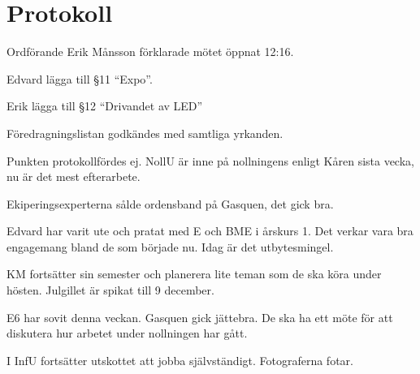 \documentclass[10pt]{article}
\def\mo{Erik Månsson}
\begin{document}
\section*{Protokoll}
\begin{paragrafer}
Ordförande {\mo} förklarade mötet öppnat 12:16.

{\valavmo}

{\valavms}

{\valavj}

{\tosg}

{\ingaadj}


Edvard \ypa lägga till \S11 ``Expo''.

Erik \ypa lägga till \S12 ``Drivandet av LED''

Föredragningslistan godkändes med samtliga yrkanden.
\begin{fyllnadsval} %
\end{fyllnadsval}

\begin{paragrafer}
Punkten protokollfördes ej.
NollU är inne på nollningens enligt Kåren sista vecka, nu är det mest efterarbete.

Ekiperingsexperterna sålde ordensband på Gasquen, det gick bra.

Edvard har varit ute och pratat med E och BME i årskurs 1. Det verkar vara bra engagemang bland de som började nu. Idag är det utbytesmingel.

KM fortsätter sin semester och planerera lite teman som de ska köra under hösten. Julgillet är spikat till 9 december.

E6 har sovit denna veckan. Gasquen gick jättebra. De ska ha ett möte för att diskutera hur arbetet under nollningen har gått.

I InfU fortsätter utskottet att jobba självständigt. Fotograferna fotar.


\end{paragrafer}
\end{paragrafer}
\end{document}
